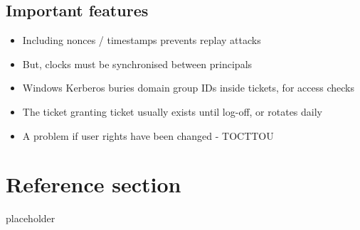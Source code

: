 \documentclass{article}
\begin{document}
\subsection{Important features}
\begin{itemize}
  \item Including nonces / timestamps prevents replay attacks 
  \item But, clocks must be synchronised between principals 
  \item Windows Kerberos buries domain group IDs inside tickets, for access checks 
  \item The ticket granting ticket usually exists until log-off, or rotates daily 
  \item A problem if user rights have been changed - TOCTTOU
\end{itemize}


\pagebreak
\section*{Reference section} \label{sec:reference}
\begin{description}
	\item[placeholder] \hfill \\
\end{description}
\end{document}
